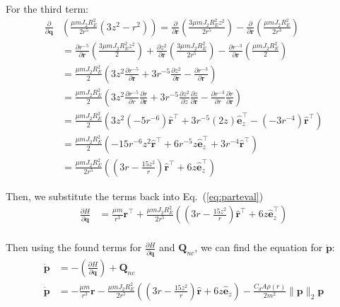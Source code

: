 \documentclass[titlepage]{article}
\begin{document}
For the third term:
\begin{equation}
	\begin{split}
		\frac{\partial}{\partial\boldsymbol{q}}&\left(\frac{\mu mJ_2R_E^2}{2r^5}\left(3z^2-r^2\right)\right)=\frac{\partial}{\partial\boldsymbol{r}}\left(\frac{3\mu mJ_2R_E^2z^2}{2r^5}\right)-\frac{\partial}{\partial\boldsymbol{r}}\left(\frac{\mu mJ_2R_E^2}{2r^3}\right) \\
		&=\frac{\partial r^{-5}}{\partial\boldsymbol{r}}\left(\frac{3\mu mJ_2R_E^2z^2}{2}\right)+\frac{\partial z^{2}}{\partial\boldsymbol{r}}\left(\frac{3\mu mJ_2R_E^2}{2r^5}\right)-\frac{\partial r^{-3}}{\partial\boldsymbol{r}}\left(\frac{\mu mJ_2R_E^2}{2}\right)  \\
		&=\frac{\mu mJ_2R_E^2}{2}\left(3z^2\frac{\partial r^{-5}}{\partial\boldsymbol{r}}+3r^{-5}\frac{\partial z^2}{\partial\boldsymbol{r}}-\frac{\partial r^{-3}}{\partial\boldsymbol{r}}\right) \\
		&=\frac{\mu mJ_2R_E^2}{2}\left(3z^2\frac{\partial r^{-5}}{\partial r}\frac{\partial r}{\partial\boldsymbol{r}}+3r^{-5}\frac{\partial z^2}{\partial z}\frac{\partial z}{\partial\boldsymbol{r}}-\frac{\partial r^{-3}}{\partial r}\frac{\partial r}{\partial\boldsymbol{r}}\right) \\
		&=\frac{\mu mJ_2R_E^2}{2}\left(3z^2\left(-5r^{-6}\right)\hat{\boldsymbol{r}}^\top+3r^{-5}\left(2z\right)\hat{\boldsymbol{e}}_z^\top-\left(-3r^{-4}\right)\hat{\boldsymbol{r}}^\top\right) \\
		&=\frac{\mu mJ_2R_E^2}{2}\left(-15r^{-6}z^2\hat{\boldsymbol{r}}^\top+6r^{-5}z\hat{\boldsymbol{e}}_z^\top+3r^{-4}\hat{\boldsymbol{r}}^\top\right) \\
		&=\frac{\mu mJ_2R_E^2}{2r^5}\left(\left(3r-\frac{15z^2}{r}\right)\hat{\boldsymbol{r}}^\top+6z\hat{\boldsymbol{e}}_z^\top\right)
	\end{split}
\end{equation}

Then, we substitute the terms back into Eq.~(\ref{eq:parteval})
\begin{equation}
	\begin{split}
		\frac{\partial H}{\partial\boldsymbol{q}}&=\frac{\mu m}{r^3}\boldsymbol{r}^\top+\frac{\mu mJ_2R_E^2}{2r^5}\left(\left(3r-\frac{15z^2}{r}\right)\hat{\boldsymbol{r}}^\top+6z\hat{\boldsymbol{e}}_z^\top\right)\\
	\end{split}
\end{equation}

Then using the found terms for $\frac{\partial H}{\partial\boldsymbol{q}}$ and $\boldsymbol{Q}_{nc}$, we can find the equation for $\dot{\boldsymbol{p}}$:
\begin{equation}
	\begin{split}
		\dot{\boldsymbol{p}}&=-\left(\frac{\partial H}{\partial\boldsymbol{q}}\right)+\boldsymbol{Q}_{nc} \\
		\dot{\boldsymbol{p}}&=-\frac{\mu m}{r^3}\boldsymbol{r}-\frac{\mu mJ_2R_E^2}{2r^5}\left(\left(3r-\frac{15z^2}{r}\right)\hat{\boldsymbol{r}}+6z\hat{\boldsymbol{e}}_z\right)-\frac{C_dA\rho(r)}{2m^2}\|\boldsymbol{p}\|_2\boldsymbol{p}
	\end{split}
\end{equation}
\end{document}
